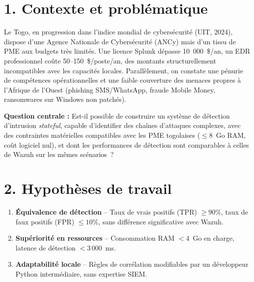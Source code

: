 \documentclass[12pt,a4paper]{article}
\begin{document}

\section*{\textcolor{mainblue}{1. Contexte et problématique}}
Le Togo, en progression dans l'indice mondial de cybersécurité (UIT, 2024), dispose d'une Agence Nationale de Cybersécurité (ANCy) mais d'un tissu de PME aux budgets très limités. Une licence Splunk dépasse 10~000~\$/an, un EDR professionnel coûte 50--150~\$/poste/an, des montants structurellement incompatibles avec les capacités locales. Parallèlement, on constate une pénurie de compétences opérationnelles et une faible couverture des menaces propres à l'Afrique de l'Ouest (phishing SMS/WhatsApp, fraude Mobile Money, ransomwares sur Windows non patchés).

\textbf{Question centrale :} Est-il possible de construire un système de détection d'intrusion \textit{stateful}, capable d'identifier des chaînes d'attaques complexes, avec des contraintes matérielles compatibles avec les PME togolaises ($\le 8$~Go RAM, coût logiciel nul), et dont les performances de détection sont comparables à celles de Wazuh sur les mêmes scénarios~?

\section*{\textcolor{mainblue}{2. Hypothèses de travail}}
\begin{enumerate}[leftmargin=*, itemsep=0.15cm]
    \item[\textbf{H1.}] \textbf{Équivalence de détection} -- Taux de vrais positifs (TPR) $\ge 90\%$, taux de faux positifs (FPR) $\le 10\%$, sans différence significative avec Wazuh.
    \item[\textbf{H2.}] \textbf{Supériorité en ressources} -- Consommation RAM $< 4$~Go en charge, latence de détection $< 3\,000$~ms.
    \item[\textbf{H3.}] \textbf{Adaptabilité locale} -- Règles de corrélation modifiables par un développeur Python intermédiaire, sans expertise SIEM.
\end{enumerate}
\end{document}
